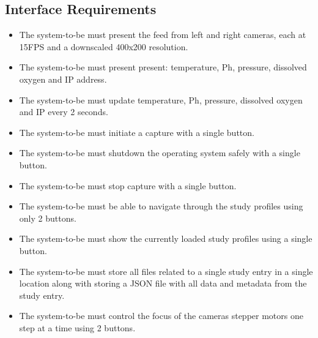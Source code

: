 \subsection{Interface Requirements}
\begin{itemize}
	\item The system-to-be must present the feed from left and right cameras, each at 15FPS and a downscaled 400x200 resolution.
	\item The system-to-be must present present: temperature, Ph, pressure, dissolved oxygen and IP address.
	\item The system-to-be must update temperature, Ph, pressure, dissolved oxygen and IP every 2 seconds.
	\item The system-to-be must initiate a capture with a single button.
	\item The system-to-be must shutdown the operating system safely with a single button.
	\item The system-to-be must stop capture with a single button.
	\item The system-to-be must be able to navigate through the study profiles using only 2 buttons.
	\item The system-to-be must show the currently loaded study profiles using a single button.
	\item The system-to-be must store all files related to a single study entry in a single location along with storing a JSON file with all data and metadata from the study entry.
	\item The system-to-be must control the focus of the cameras stepper motors one step at a time using 2 buttons.
\end{itemize}